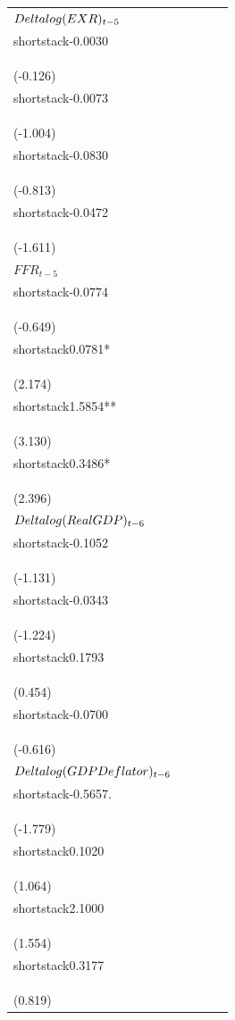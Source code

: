 \begin{table}[H]
\begin{tabular}{l c c c c}
$\\Delta\\log(EXR)_{t-5}$ & \\shortstack{-0.0030\\\\(-0.126)} & \\shortstack{-0.0073\\\\(-1.004)} & \\shortstack{-0.0830\\\\(-0.813)} & \\shortstack{-0.0472\\\\(-1.611)} \\
$FFR_{t-5}$ & \\shortstack{-0.0774\\\\(-0.649)} & \\shortstack{0.0781*\\\\(2.174)} & \\shortstack{1.5854**\\\\(3.130)} & \\shortstack{0.3486*\\\\(2.396)} \\
$\\Delta\\log(Real\\ GDP)_{t-6}$ & \\shortstack{-0.1052\\\\(-1.131)} & \\shortstack{-0.0343\\\\(-1.224)} & \\shortstack{0.1793\\\\(0.454)} & \\shortstack{-0.0700\\\\(-0.616)} \\
$\\Delta\\log(GDP\\ Deflator)_{t-6}$ & \\shortstack{-0.5657.\\\\(-1.779)} & \\shortstack{0.1020\\\\(1.064)} & \\shortstack{2.1000\\\\(1.554)} & \\shortstack{0.3177\\\\(0.819)} \\

\end{tabular}
\end{table}
